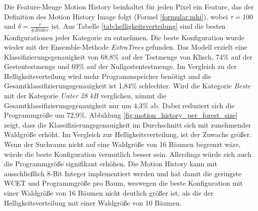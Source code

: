 Die Feature-Menge Motion History beinhaltet für jeden Pixel ein Feature, das der Definition des Motion History Image folgt (Formel \ref{formular:mhi}), wobei $\tau=100$ und $\delta=\frac{\tau}{\#Bilder}$ ist.
\newline
\newline
Aus Tabelle \ref{tab:helligkeitsverteilung} sind die besten Konfigurationen jeder Kategorie zu entnehmen. Die beste Konfiguration wurde wieder mit der Ensemble-Methode \textit{ExtraTrees} gefunden.
Das Modell erzielt eine Klassifizierungsgenauigkeit von 68,8\% auf der Testmenge von Klisch, 74\% auf der Gestentestmenge und 69\% auf der Nullgestentestmenge. Im Vergleich zu der Helligkeitsverteilung
wird mehr Programmspeicher benötigt und die Gesamtklassifizierungsgenauigkeit ist 1,84\% schlechter.
\newline
\newline
Wird die Kategorie \textit{Beste} mit der Kategorie \textit{Unter 28 kB} verglichen, nimmt die Gesamtklassifizierungsgenauigkeit nur um 4,3\% ab. Dabei reduziert sich die Programmgröße um 72,9\%.
Abbildung \ref{fig:motion_history_per_forest_size} zeigt, dass die Klassifizierungsgenauigkeit im Durchschnitt sich mit zunehmender Waldgröße erhöht. Im Vergleich zur Helligkeitsverteilung, ist der Zuwachs größer.
Wenn der Suchraum nicht auf eine Waldgröße von 16 Bäumen begrenzt wäre, würde die beste Konfiguration vermutlich besser sein. Allerdings würde sich auch die Programmgröße signifikant erhöhen.
\newline
\newline
Die Motion History kann mit ausschließlich 8-Bit Integer implementiert werden und hat damit die geringste WCET und Programmgröße pro Baum, weswegen die beste Konfiguration mit einer Waldgröße von 16 Bäumen nicht deutlich
größer ist, als die der Helligkeitsverteilung mit einer Waldgröße von 10 Bäumen.
